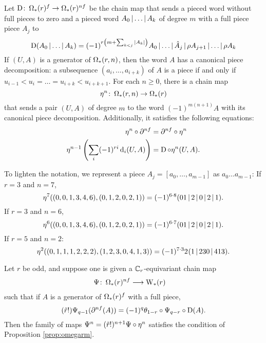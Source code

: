 Let $\operatorname{D}\colon \operatorname{\Omega}_{*}(r)^{f}\to \operatorname{\Omega}_{*}(r)^{nf}$ be the chain map that sends a pieced word without full pieces to zero and a pieced word $A_0\operatorname{|}\ldots\operatorname{|} A_k$ of degree $m$ with a full piece piece $A_j$ to
\[
\operatorname{D}(A_0\operatorname{|} \ldots\operatorname{|} A_k) = (-1)^{r\left(m+\sum_{k<j} |A_k|\right)} A_0\operatorname{|} \ldots\operatorname{|} \hat{A}_{j}\operatorname{|} \rho A_{j+1}\operatorname{|} \ldots\operatorname{|} \rho A_k
\]
If $(U,A)$ is a generator of $\operatorname{\Omega}_{*}(r,n)$, then the word $A$ has a canonical piece decomposition: a subsequence $(a_i,\ldots,a_{i+k})$ of $A$ is a piece if and only if $u_{i-1}<u_i =\ldots= u_{i+k}<u_{i+k+1}$. For each $n\geq 0$, there is a chain map
\[\eta^n\colon \operatorname{\Omega}_{*}(r,n)\to \operatorname{\Omega}_{*}(r)\]
that sends a pair $(U,A)$ of degree $m$ to the word $(-1)^{m(n+1)}A$ with its canonical piece decomposition. Additionally, it satisfies the following equations:
\begin{align}\label{eq:lambda2}
\eta^n\circ \partial^{nf} &= \partial^{nf}\circ \eta^n
\\
\label{eq:lambda0}
	\eta^{n-1}\left(\sum_i (-1)^{ri}\operatorname{d}_i(U,A)\right) &= \operatorname{D}\circ \eta^n(U,A).
\end{align}
%
\begin{example}\label{example:omegar} To lighten the notation, we represent a piece $A_j = [a_0,\ldots,a_{m-1}]$ as $a_0\ldots a_{m-1}$: If $r=3$ and $n=7$,
	\[
		\eta^7((0,0,1,3,4,6),(0,1,2,0,2,1)) = (-1)^{6\cdot 8}(01\operatorname{|} 2\operatorname{|} 0\operatorname{|} 2\operatorname{|} 1).
	\]
	If $r=3$ and $n=6$,
	\[
		\eta^6((0,0,1,3,4,6),(0,1,2,0,2,1)) = (-1)^{6\cdot 7}(01\operatorname{|} 2\operatorname{|} 0\operatorname{|} 2\operatorname{|} 1).
	\]
	If $r=5$ and $n=2$:
	\[
		\eta^2((0,1,1,1,2,2,2),(1,2,3,0,4,1,3)) = (-1)^{7\cdot 3} 2^{}(1\operatorname{|} 230\operatorname{|} 413).
	\]
\end{example}

\begin{lemma} \label{lemma:omegar}
	Let $r$ be odd, and suppose one is given a $\mathbb{C}_r$-equivariant chain map
	\begin{align*}
		\Psi\colon \operatorname{\Omega}_{*}(r)^{nf}&\longrightarrow \operatorname{W}_{*}(r)
	\end{align*}
	such that if $A$ is a generator of $\operatorname{\Omega}_{*}(r)^{f}$ with a full piece,
	\begin{equation}\label{eq:lambda}
		(\tilde{r}!)\Psi_{q-1}(\partial^{nf} (A)) = (-1)^q\theta_{1-r}\circ\Psi_{q-r}\circ\operatorname{D}(A).
	\end{equation}
	Then the family of maps $\Psi^n = (\tilde{r}!)^{n+1}\Psi\circ \eta^n$ satisfies the condition of Proposition \ref{prop:omegarm}.
\end{lemma}

